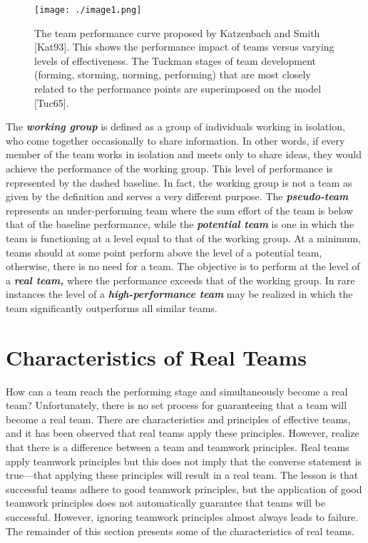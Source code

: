\begin{figure}
\texttt{[image: ./image1.png]}
\caption{The team performance curve proposed by Katzenbach
and Smith {[}Kat93{]}. This shows the performance impact of teams versus
varying levels of effectiveness. The Tuckman stages of team development
(forming, storming, norming, performing) that are most closely related
to the performance points are superimposed on the model {[}Tuc65{]}.}
\label{figure:teamPerformance}
\end{figure}

The \emph{\textbf{working group}} is defined as a group of individuals
working in isolation, who come together occasionally to share
information. In other words, if every member of the team works in
isolation and meets only to share ideas, they would achieve the
performance of the working group. This level of performance is
represented by the dashed baseline. In fact, the working group is not a
team as given by the definition and serves a very different purpose. The
\emph{\textbf{pseudo-team}} represents an under-performing team where
the sum effort of the team is below that of the baseline performance,
while the \emph{\textbf{potential team}} is one in which the team is
functioning at a level equal to that of the working group. At a minimum,
teams should at some point perform above the level of a potential team,
otherwise, there is no need for a team. The objective is to perform at
the level of a \emph{\textbf{real team,}} where the performance exceeds
that of the working group. In rare instances the level of a
\emph{\textbf{high-performance team}} may be realized in which the team
significantly outperforms all similar teams.

\section{Characteristics of Real Teams}
\label{setion:characteristics-of-real-teams}

How can a team reach the performing stage and simultaneously become a
real team? Unfortunately, there is no set process for guaranteeing that
a team will become a real team. There are characteristics and principles
of effective teams, and it has been observed that real teams apply these
principles. However, realize that there is a difference between a team
and teamwork principles. Real teams apply teamwork principles but this
does not imply that the converse statement is true---that applying these
principles will result in a real team. The lesson is that successful
teams adhere to good teamwork principles, but the application of good
teamwork principles does not automatically guarantee that teams will be
successful. However, ignoring teamwork principles almost always leads to
failure. The remainder of this section presents some of the
characteristics of real teams.

